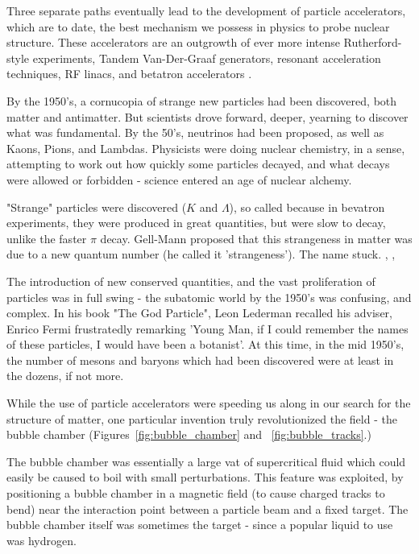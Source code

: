 Three separate paths eventually lead to the development of particle
accelerators, which are to date, the best mechanism we possess in physics to
probe nuclear structure. These accelerators are an outgrowth
of ever more intense Rutherford-style experiments, Tandem Van-Der-Graaf
generators, resonant acceleration techniques, RF linacs, and betatron
accelerators \cite{Bryant1994}.

By the 1950's, a cornucopia of strange new particles had been discovered, both
matter and antimatter. But scientists drove forward, deeper, yearning to
discover what was fundamental. By the 50's, neutrinos had been proposed, as well
as Kaons, Pions, and Lambdas. Physicists were doing nuclear chemistry, in a
sense, attempting to work out how quickly some particles decayed, and what
decays were allowed or forbidden - science entered an age of nuclear alchemy.

"Strange" particles were discovered ($K$ and $\Lambda$), so called because in
bevatron experiments, they were produced in great quantities, but were slow to
decay, unlike the faster $\pi$ decay. Gell-Mann proposed that this strangeness
in matter was due to a new quantum number (he called it 'strangeness'). The name
stuck.
 \cite{Gell-Mann1953}, \cite{Gell-Mann1956}, \cite{Krauss2015}

The introduction of new conserved quantities, and the vast proliferation of
particles was in full swing - the subatomic world by the 1950's was confusing,
and complex. In his book "The God Particle", Leon Lederman recalled his adviser,
Enrico Fermi frustratedly remarking 'Young Man, if I could remember the names of
these particles, I would have been a botanist'. At this time, in the mid 1950's,
the number of mesons and baryons which had been discovered were at least in the
dozens, if not more.

While the use of particle accelerators were speeding us along in  our search for
the structure of matter, one particular invention truly revolutionized the
field - the bubble chamber (Figures~\ref{fig:bubble_chamber} and
~\ref{fig:bubble_tracks}.)

The bubble chamber was essentially a large vat of supercritical fluid which
could easily be caused to boil with small perturbations. This feature was
exploited, by positioning a bubble chamber in a magnetic field (to cause charged
tracks to bend) near the interaction point between a particle beam and a fixed
target. The bubble chamber itself was sometimes the target - since a popular
liquid to use was hydrogen. 

